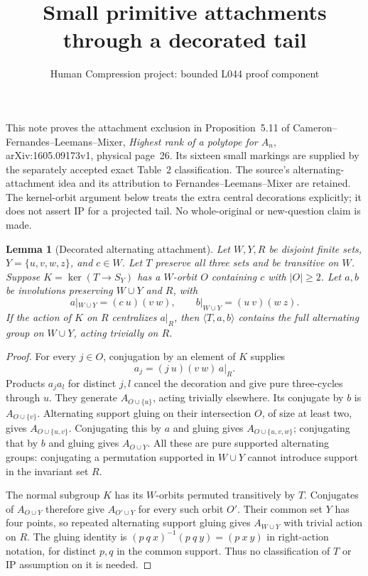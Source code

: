 \documentclass[11pt,a4paper]{article}
\title{Small primitive attachments through a decorated tail}
\author{Human Compression project: bounded L044 proof component}
\date{}
\newtheorem{lemma}{Lemma}
\newcommand{\gen}[1]{\langle#1\rangle}
\begin{document}
\maketitle
This note proves the attachment exclusion in Proposition~5.11 of
Cameron--Fernandes--Leemans--Mixer, \emph{Highest rank of a polytope
for $A_n$}, arXiv:1605.09173v1, physical page~26. Its sixteen small
markings are supplied by the separately accepted exact Table~2
classification. The source's alternating-attachment idea and its
attribution to Fernandes--Leemans--Mixer are retained. The kernel-orbit
argument below treats the extra central decorations explicitly; it
does not assert IP for a projected tail. No whole-original or
new-question claim is made.

\begin{lemma}[Decorated alternating attachment]\label{lem:decorated}
Let $W,Y,R$ be disjoint finite sets, $Y=\{u,v,w,z\}$, and $c\in W$.
Let $T$ preserve all three sets and be transitive on $W$.
Suppose $K=\ker(T\to S_Y)$ has a $W$-orbit $O$ containing $c$
with $|O|\geq2$. Let $a,b$ be involutions preserving $W\cup Y$ and $R$, with
\[
 a|_{W\cup Y}=(c\ u)(v\ w),\qquad
 b|_{W\cup Y}=(u\ v)(w\ z).
\]
If the action of $K$ on $R$ centralizes $a|_R$, then
$\gen{T,a,b}$ contains the full alternating group on $W\cup Y$,
acting trivially on $R$.
\end{lemma}
\begin{proof}
For every $j\in O$, conjugation by an element of $K$ supplies
\[
                    a_j=(j\ u)(v\ w)\,a|_R.
\]
Products $a_j a_l$ for distinct $j,l$ cancel the decoration and
give pure three-cycles through $u$. They generate
$A_{O\cup\{u\}}$, acting trivially elsewhere. Its conjugate by
$b$ is $A_{O\cup\{v\}}$. Alternating support gluing on their
intersection $O$, of size at least two, gives
$A_{O\cup\{u,v\}}$. Conjugating this by $a$ and gluing gives
$A_{O\cup\{u,v,w\}}$; conjugating that by $b$ and gluing gives
$A_{O\cup Y}$. All these are pure supported alternating groups:
conjugating a permutation supported in $W\cup Y$ cannot introduce
support in the invariant set $R$.

The normal subgroup $K$ has its $W$-orbits permuted transitively
by $T$. Conjugates of $A_{O\cup Y}$ therefore give
$A_{O'\cup Y}$ for every such orbit $O'$. Their common set $Y$
has four points, so repeated alternating support gluing gives
$A_{W\cup Y}$ with trivial action on $R$. The gluing identity
is $(p\ q\ x)^{-1}(p\ q\ y)=(p\ x\ y)$ in right-action
notation, for distinct $p,q$ in the common support. Thus no
classification of $T$ or IP assumption on it is needed.
\end{proof}
\end{document}
